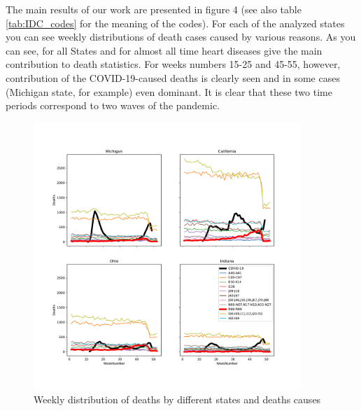\documentclass[conference]{IEEEtran}
\begin{document}
The main results of our work are presented in figure 4 (see also table \ref{tab:IDC_codes} for the meaning of the codes). For each of the analyzed states you can see weekly distributions of death cases caused by various reasons. As you can see, for all States and for almost all time heart diseases give the main contribution to death statistics. For weeks numbers 15-25 and 45-55, however, contribution of the COVID-19-caused deaths is clearly seen and in some cases (Michigan state, for example) even dominant. It is clear that these two time periods correspond to two waves of the pandemic.


\begin{figure}
  \centering
  \includegraphics[width=0.9\textwidth]{figs/weekly_deaths}
  \caption{Weekly distribution of deaths by different states and deaths causes}
  \label{fig:weekly_deaths}
\end{figure}
\end{document}
